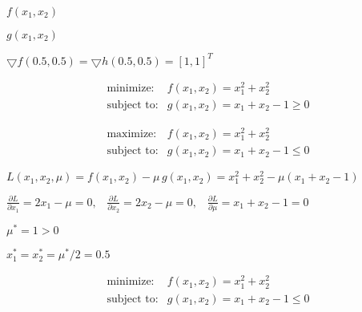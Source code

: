 \documentclass{article}
\def\lthtmlcheckvsize{\ifdim\ht\sizebox<\vsize 
  \ifdim\wd\sizebox<\hsize\expandafter\hfill\fi \expandafter\vfill
  \else\expandafter\vss\fi}%
\begin{document}
{\newpage\clearpage
{}%
$ f(x_1,x_2)$%
\lthtmlindisplaymathZ
\lthtmlcheckvsize\clearpage}

{\newpage\clearpage
{}%
$ g(x_1,x_2)$%
\lthtmlindisplaymathZ
\lthtmlcheckvsize\clearpage}

{\newpage\clearpage
{}%
$\displaystyle \bigtriangledown f(0.5,0.5)=\bigtriangledown h(0.5,0.5)=[1,1]^T$%
\lthtmlindisplaymathZ
\lthtmlcheckvsize\clearpage}

{\newpage\clearpage
{}%
\begin{displaymath}\begin{array}{ll}
\mbox{minimize:} & f(x_1,x_2)=x^2_1+x^2_2\\
\mbox{subject to:} & g(x_1,x_2)=x_1+x_2-1\ge 0
\end{array}\end{displaymath}%
\lthtmldisplayZ
\lthtmlcheckvsize\clearpage}

{\newpage\clearpage
{}%
\begin{displaymath}\begin{array}{ll}
\mbox{maximize:} & f(x_1,x_2)=x^2_1+x^2_2\\
\mbox{subject to:} & g(x_1,x_2)=x_1+x_2-1\le 0
\end{array}\end{displaymath}%
\lthtmldisplayZ
\lthtmlcheckvsize\clearpage}

{\newpage\clearpage
{}%
$\displaystyle L(x_1,x_2,\mu)=f(x_1,x_2)-\mu\, g(x_1,x_2)=x^2_1+x^2_2-\mu(x_1+x_2-1)$%
\lthtmlindisplaymathZ
\lthtmlcheckvsize\clearpage}

{\newpage\clearpage
{}%
$\displaystyle \frac{\partial L}{\partial x_1}=2x_1-\mu=0,\;\;\;
\frac{\partial L}{\partial x_2}=2x_2-\mu=0,\;\;\;
\frac{\partial L}{\partial \mu}=x_1+x_2-1=0$%
\lthtmlindisplaymathZ
\lthtmlcheckvsize\clearpage}

{\newpage\clearpage
{}%
$ \mu^*=1>0$%
\lthtmlindisplaymathZ
\lthtmlcheckvsize\clearpage}

{\newpage\clearpage
{}%
$ x_1^*=x_2^*=\mu^*/2=0.5$%
\lthtmlindisplaymathZ
\lthtmlcheckvsize\clearpage}

{\newpage\clearpage
{}%
\begin{displaymath}\begin{array}{ll}
\mbox{minimize:} & f(x_1,x_2)=x^2_1+x^2_2\\
\mbox{subject to:} & g(x_1,x_2)=x_1+x_2-1\le 0
\end{array}\end{displaymath}%
\lthtmldisplayZ
\lthtmlcheckvsize\clearpage}
\end{document}
